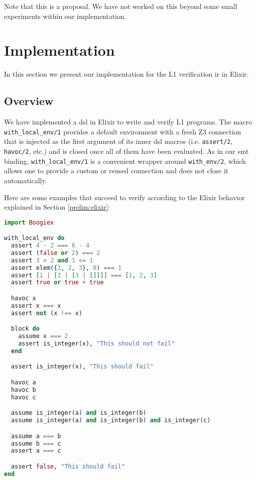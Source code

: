 Note that this is a proposal. We have not worked on this beyond some small
experiments within our implementation.

\section{Implementation}
\label{ir:l1implementation}

In this section we present our implementation for the L1 verification \gls{ir}
in Elixir.

\subsection{Overview}
\label{ir:dslexample}

We have implemented a \gls{dsl} in Elixir to write and verify L1 programs. The
macro \verb|with_local_env/1| provides a default environment with a fresh Z3
connection that is injected as the first argument of its inner \gls{dsl} macros
(i.e. \verb|assert/2|, \verb|havoc/2|, etc.) and is closed once all of them have
been evaluated. As in our \acrshort{smt} binding, \verb|with_local_env/1| is a
convenient wrapper around \verb|with_env/2|, which allows one to provide a
custom or reused connection and does not close it automatically.

Here are some examples that succeed to verify according to the Elixir behavior 
explained in Section \ref{prelim:elixir}:

\begin{lstlisting}[language=elixir,numbers=none,frame=none]
import Boogiex

with_local_env do
  assert 4 - 2 === 6 - 4
  assert (false or 2) === 2
  assert 3 > 2 and 1 <= 1
  assert elem({1, 2, 3}, 0) === 1
  assert [1 | [2 | [3 | []]]] === [1, 2, 3]
  assert true or true + true

  havoc x
  assert x === x
  assert not (x !== x)

  block do
    assume x === 2
    assert is_integer(x), "This should not fail"
  end

  assert is_integer(x), "This should fail"

  havoc a
  havoc b
  havoc c

  assume is_integer(a) and is_integer(b)
  assume is_integer(a) and is_integer(b) and is_integer(c)

  assume a === b
  assume b === c
  assert a === c

  assert false, "This should fail"
end
\end{lstlisting}

